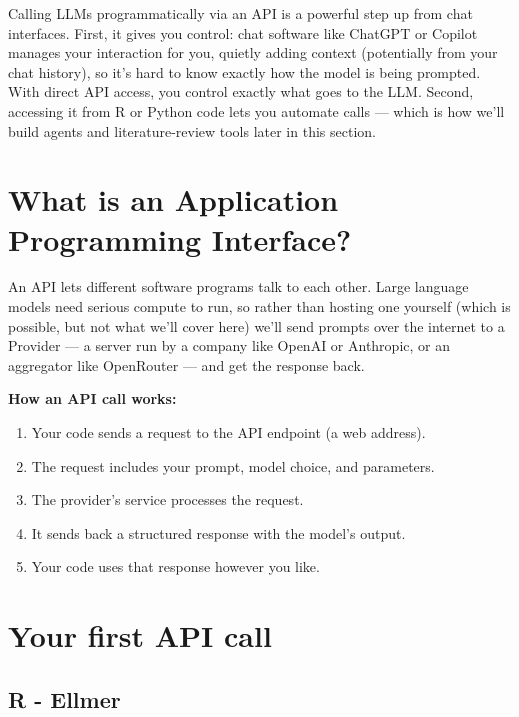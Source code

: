 \documentclass[
  letterpaper,
  DIV=11,
  numbers=noendperiod]{scrreprt}
\providecommand{\tightlist}{%
  \setlength{\itemsep}{0pt}\setlength{\parskip}{0pt}}
\begin{document}
Calling LLMs programmatically via an API is a powerful step up from chat
interfaces. First, it gives you control: chat software like ChatGPT or
Copilot manages your interaction for you, quietly adding context
(potentially from your chat history), so it's hard to know exactly how
the model is being prompted. With direct API access, you control exactly
what goes to the LLM. Second, accessing it from R or Python code lets
you automate calls --- which is how we'll build agents and
literature-review tools later in this section.

\section{What is an Application Programming
Interface?}\label{what-is-an-application-programming-interface}

An API lets different software programs talk to each other. Large
language models need serious compute to run, so rather than hosting one
yourself (which is possible, but not what we'll cover here) we'll send
prompts over the internet to a Provider --- a server run by a company
like OpenAI or Anthropic, or an aggregator like OpenRouter --- and get
the response back.

\textbf{How an API call works:}

\begin{enumerate}
\def\labelenumi{\arabic{enumi}.}
\tightlist
\item
  Your code sends a request to the API endpoint (a web address).
\item
  The request includes your prompt, model choice, and parameters.
\item
  The provider's service processes the request.
\item
  It sends back a structured response with the model's output.
\item
  Your code uses that response however you like.
\end{enumerate}

\section{Your first API call}\label{your-first-api-call}

\subsection{R - Ellmer}
\end{document}
